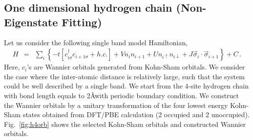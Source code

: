 \subsection{One dimensional hydrogen chain (Non-Eigenstate Fitting)}
Let us consider the following single band model Hamiltonian,
\begin{eqnarray}\label{eq:h4model}
H &=& \sum_{i}\left\{-t[c^{\dagger}_{i\sigma}c_{i+1\sigma} +h.c.]+ Vn_{i}n_{i+1} + Un_{i\uparrow}n_{i\downarrow}+ J\vec \sigma_{i}\cdot \vec \sigma_{i+1}\right\} + C\,.
\end{eqnarray}
Here, $c_{i}$'s are Wannier orbitals generated from Kohn-Sham orbitals. We consider the case where the inter-atomic distance is relatively large, such that the system could be well described by a single band.  We start from the 4-site hydrogen chain with bond length equals to 2\AA with periodic boundary condition. We construct the Wannier orbitals by a unitary transformation of the four lowest energy Kohn-Sham states obtained from DFT/PBE calculation (2 occupied and 2 unoccupied). Fig.~\ref{fig:h4orb} shows the selected Kohn-Sham orbitals and constructed Wannier orbitals. 
